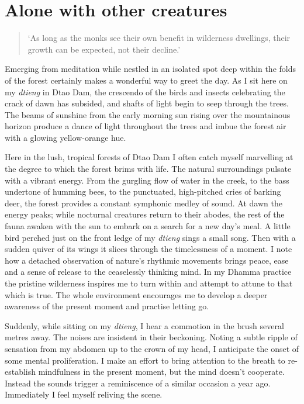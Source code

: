 
\section{Alone with other creatures}

\begin{quote}
\small
`As long as the monks see their own benefit in wilderness
dwellings, their growth can be expected, not their decline.'
\end{quote}

Emerging from meditation while nestled in an isolated spot deep within
the folds of the forest certainly makes a wonderful way to greet the
day. As I sit here on my \emph{dtieng} in Dtao Dam, the crescendo of the
birds and insects celebrating the crack of dawn has subsided, and shafts
of light begin to seep through the trees. The beams of sunshine from the
early morning sun rising over the mountainous horizon produce a dance of
light throughout the trees and imbue the forest air with a glowing
yellow-orange hue. 

Here in the lush, tropical forests of Dtao Dam I often catch myself
marvelling at the degree to which the forest brims with life. The
natural surroundings pulsate with a vibrant energy. From the gurgling
flow of water in the creek, to the bass undertone of humming bees, to
the punctuated, high-pitched cries of barking deer, the forest provides
a constant symphonic medley of sound. At dawn the energy peaks; while
nocturnal creatures return to their abodes, the rest of the fauna awaken
with the sun to embark on a search for a new day's meal. A little bird
perched just on the front ledge of my \emph{dtieng} sings a small song. 
Then with a sudden quiver of its wings it slices through the
timelessness of a moment. I note how a detached observation of nature's
rhythmic movements brings peace, ease and a sense of release to the
ceaselessly thinking mind. In my Dhamma practice the pristine wilderness
inspires me to turn within and attempt to attune to that which is true. 
The whole environment encourages me to develop a deeper awareness of the
present moment and practise letting go. 

Suddenly, while sitting on my \emph{dtieng}, I hear a commotion in the
brush several metres away. The noises are insistent in their beckoning. 
Noting a subtle ripple of sensation from my abdomen up to the crown of
my head, I anticipate the onset of some mental proliferation. I make an
effort to bring attention to the breath to re-establish mindfulness in
the present moment, but the mind doesn't cooperate. Instead the sounds
trigger a reminiscence of a similar occasion a year ago. Immediately I
feel myself reliving the scene. 

